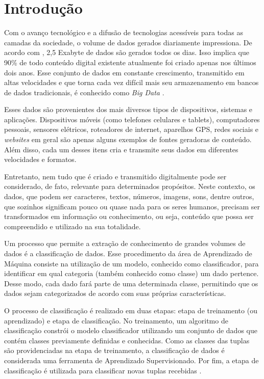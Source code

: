 \chapter{Introdução}\label{chp:Introducao}

Com o avanço tecnológico e a difusão de tecnologias acessíveis para todas as camadas da sociedade, o volume de dados gerados diariamente impressiona. De acordo com , 2,5 Exabyte de dados são gerados todos os dias. Isso implica que 90\% de todo conteúdo digital existente atualmente foi criado apenas nos últimos dois anos. 
Esse conjunto de dados em constante crescimento, transmitido em altas velocidades e que torna cada vez difícil mais seu armazenamento em bancos de dados tradicionais, é conhecido como \textit{Big Data} \cite{Siddiqa2016}.

Esses dados são provenientes dos mais diversos tipos de dispositivos, sistemas e aplicações. Dispositivos móveis (como telefones celulares e tablets), computadores pessoais, sensores elétricos, roteadores de internet, aparelhos GPS, redes sociais e 
\textit{websites} em geral são apenas alguns exemplos de fontes geradoras de conteúdo.  Além disso, cada um desses itens cria e transmite seus dados em diferentes velocidades e formatos.

Entretanto, nem tudo que é criado e transmitido digitalmente pode ser considerado, de fato, relevante para determinados propósitos. Neste contexto, os dados, que podem ser caracteres, textos, números, imagens, sons, dentre outros, que sozinhos significam pouco ou quase nada para os seres humanos, precisam ser transformados em informação ou conhecimento, ou seja, conteúdo que possa ser compreendido e utilizado na sua totalidade. 

Um processo que permite a extração de conhecimento de grandes volumes de dados é a classificação de dados. Esse procedimento da área de Aprendizado de Máquina consiste na utilização de um modelo, conhecido como classificador, para identificar em qual categoria (também conhecido como classe) um dado pertence. Desse modo, cada dado fará parte de uma determinada classe, permitindo que os dados sejam categorizados de acordo com suas próprias características.

O processo de classificação é realizado em duas etapas: etapa de treinamento (ou aprendizado) e etapa de classificação. No treinamento, um algoritmo de classificação constrói o modelo classificador utilizando um conjunto de dados que contém classes previamente definidas e conhecidas. Como as classes das tuplas são providenciadas na etapa de treinamento, a classificação de dados é considerada uma ferramenta de Aprendizado Supervisionado. Por fim, a etapa de classificação é utilizada para classificar novas tuplas recebidas \cite{Han2006}. 

